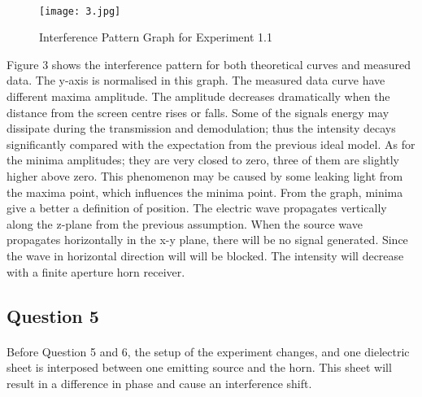 \documentclass[12pt]{article}
\begin{document}
    \paragraph{}
    \begin{figure}[H]
    \centering
    \texttt{[image: 3.jpg]}
    \caption{Interference Pattern Graph for Experiment 1.1}
    \end{figure}
    Figure 3 shows the interference pattern for both theoretical curves and measured data. The y-axis is normalised in this graph. The measured data curve have different maxima amplitude. The amplitude decreases dramatically when the distance from the screen centre rises or falls. Some of the signals energy may dissipate during the transmission and demodulation; thus the intensity decays significantly compared with the expectation from the previous ideal model. As for the minima amplitudes; they are very closed to zero, three of them are slightly higher above zero. This phenomenon may be caused by some leaking light from the maxima point, which influences the minima point. From the graph, minima give a better a definition of position. The electric wave propagates vertically along the z-plane from the previous assumption. When the source wave propagates horizontally in the x-y plane, there will be no signal generated. Since the wave in horizontal direction will will be blocked. The intensity will decrease with a finite aperture horn receiver.
    
    
    \subsection{Question 5}
    \paragraph{}
    Before Question 5 and 6, the setup of the experiment changes, and one dielectric sheet is interposed between one emitting source and the horn. This sheet will result in a difference in phase and cause an interference shift.
\end{document}
